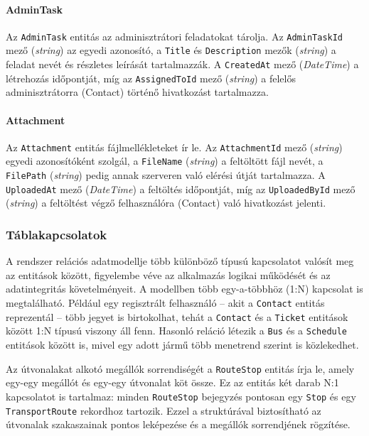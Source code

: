 \paragraph{AdminTask}

Az \texttt{AdminTask} entitás az adminisztrátori feladatokat tárolja. Az \texttt{AdminTaskId} mező (\textit{string}) az egyedi azonosító, a \texttt{Title} és \texttt{Description} mezők (\textit{string}) a feladat nevét és részletes leírását tartalmazzák. A \texttt{CreatedAt} mező (\textit{DateTime}) a létrehozás időpontját, míg az \texttt{AssignedToId} mező (\textit{string}) a felelős adminisztrátorra (Contact) történő hivatkozást tartalmazza.

\paragraph{Attachment}

Az \texttt{Attachment} entitás fájlmellékleteket ír le. Az \texttt{AttachmentId} mező (\textit{string}) egyedi azonosítóként szolgál, a \texttt{FileName} (\textit{string}) a feltöltött fájl nevét, a \texttt{FilePath} (\textit{string}) pedig annak szerveren való elérési útját tartalmazza. A \texttt{UploadedAt} mező (\textit{DateTime}) a feltöltés időpontját, míg az \texttt{UploadedById} mező (\textit{string}) a feltöltést végző felhasználóra (Contact) való hivatkozást jelenti.


\subsubsection{Táblakapcsolatok}

A rendszer relációs adatmodellje több különböző típusú kapcsolatot valósít meg az entitások között, figyelembe véve az alkalmazás logikai működését és az adatintegritás követelményeit. A modellben több egy-a-többhöz (1:N) kapcsolat is megtalálható. Például egy regisztrált felhasználó – akit a \texttt{Contact} entitás reprezentál – több jegyet is birtokolhat, tehát a \texttt{Contact} és a \texttt{Ticket} entitások között 1:N típusú viszony áll fenn. Hasonló reláció létezik a \texttt{Bus} és a \texttt{Schedule} entitások között is, mivel egy adott jármű több menetrend szerint is közlekedhet.

Az útvonalakat alkotó megállók sorrendiségét a \texttt{RouteStop} entitás írja le, amely egy-egy megállót és egy-egy útvonalat köt össze. Ez az entitás két darab N:1 kapcsolatot is tartalmaz: minden \texttt{RouteStop} bejegyzés pontosan egy \texttt{Stop} és egy \texttt{TransportRoute} rekordhoz tartozik. Ezzel a struktúrával biztosítható az útvonalak szakaszainak pontos leképezése és a megállók sorrendjének rögzítése.

